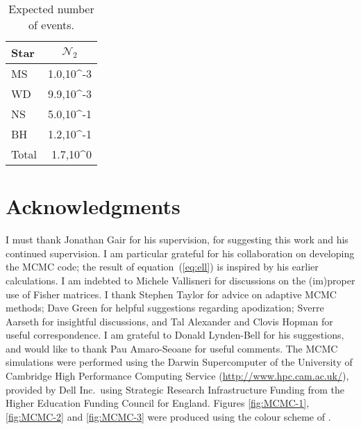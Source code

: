 \documentclass[a4paper, 10pt, titlepage, twoside]{article}
\newcommand{\eqnref}[1]{equation~(\ref{eq:#1})}
\begin{document}
\setcounter{page}{1}
\begin{table}
 \centering
  \begin{tabular}{l D{,}{\,\times}{3.4}}
    \toprule
   Star &  \\
 \midrule
 MS & 1.0,10^{-3} \\
 WD & 9.9,10^{-3} \\
 NS & 5.0,10^{-1} \\
 BH & 1.2,10^{-1} \\
\midrule
Total & 1.7,10^{0}\\
\bottomrule
\end{tabular}
  \caption{Expected number of events.\label{tab:Rates}}
\end{table}

%
%
%
%

\section*{Acknowledgments}

I must thank Jonathan Gair for his supervision, for suggesting this work and his continued supervision. I am particular grateful for his collaboration on developing the MCMC code; the result of \eqnref{ell} is inspired by his earlier calculations. I am indebted to Michele Vallisneri for discussions on the (im)proper use of Fisher matrices. I thank Stephen Taylor for advice on adaptive MCMC methods; Dave Green for helpful suggestions regarding apodization; Sverre Aarseth for insightful discussions, and Tal Alexander and Clovis Hopman for useful correspondence. I am grateful to Donald Lynden-Bell for his suggestions, and would like to thank Pau Amaro-Seoane for useful comments. The MCMC simulations were performed using the Darwin Supercomputer of the University of Cambridge High Performance Computing Service (\url{http://www.hpc.cam.ac.uk/}), provided by Dell Inc.\ using Strategic Research Infrastructure Funding from the Higher Education Funding Council for England. Figures \ref{fig:MCMC-1}, \ref{fig:MCMC-2} and \ref{fig:MCMC-3} were produced using the colour scheme of \citet{Green2011}.

\newpage




\newpage

%

\end{document}
